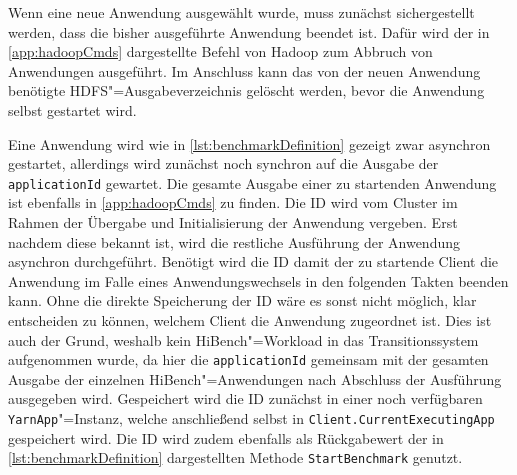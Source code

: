 Wenn eine neue Anwendung ausgewählt wurde, muss zunächst sichergestellt werden, dass die bisher ausgeführte Anwendung beendet ist. Dafür wird der in \autoref{app:hadoopCmds} dargestellte Befehl von Hadoop zum Abbruch von Anwendungen ausgeführt. Im Anschluss kann das von der neuen Anwendung benötigte \ac{HDFS}"=Ausgabeverzeichnis gelöscht werden, bevor die Anwendung selbst gestartet wird.

Eine Anwendung wird wie in \autoref{lst:benchmarkDefinition} gezeigt zwar asynchron gestartet, allerdings wird zunächst noch synchron auf die Ausgabe der \texttt{applicationId} gewartet. Die gesamte Ausgabe einer zu startenden Anwendung ist ebenfalls in \autoref{app:hadoopCmds} zu finden. Die ID wird vom Cluster im Rahmen der Übergabe und Initialisierung der Anwendung vergeben. Erst nachdem diese bekannt ist, wird die restliche Ausführung der Anwendung asynchron durchgeführt. Benötigt wird die ID damit der zu startende Client die Anwendung im Falle eines Anwendungswechsels in den folgenden Takten beenden kann. Ohne die direkte Speicherung der ID wäre es sonst nicht möglich, klar entscheiden zu können, welchem Client die Anwendung zugeordnet ist. Dies ist auch der Grund, weshalb kein HiBench"=Workload in das Transitionssystem aufgenommen wurde, da hier die \texttt{applicationId} gemeinsam mit der gesamten Ausgabe der einzelnen HiBench"=Anwendungen nach Abschluss der Ausführung ausgegeben wird. Gespeichert wird die ID zunächst in einer noch verfügbaren \texttt{YarnApp}"=Instanz, welche anschließend selbst in \texttt{Client.CurrentExecutingApp} gespeichert wird. Die ID wird zudem ebenfalls als Rückgabewert der in \autoref{lst:benchmarkDefinition} dargestellten Methode \texttt{StartBenchmark} genutzt.